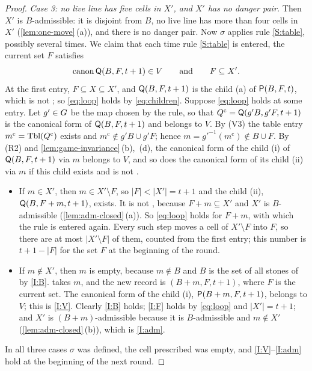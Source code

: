 \begin{proof}
\smallskip\noindent\emph{Case 3: no live line has five cells in $X'$, and $X'$ has no danger pair.} Then $X'$
is $B$-admissible: it is disjoint from $B$, no live line has more than four cells in $X'$
(\cref{lem:one-move}\,(a)), and there is no danger pair. Now $\sigma$ applies rule \ref{S:table}, possibly
several times. We claim that each time rule \ref{S:table} is entered, the current set $F$ satisfies
\begin{equation}\label{eq:loop}
  \operatorname{canon}\mathsf{Q}(B,F,t+1)\in V\qquad\text{and}\qquad F\subseteq X'.
\end{equation}
At the first entry, $F\subseteq X\subseteq X'$, and $\mathsf{Q}(B,F,t+1)$ is the child \textup{(a)} of
$\mathsf{P}(B,F,t)$, which is not \VOID; so \eqref{eq:loop} holds by \eqref{eq:children}. Suppose \eqref{eq:loop}
holds at some entry. Let $g'\in G$ be the map chosen by the rule, so that
$Q^{\mathrm c}=\mathsf{Q}(g'B,g'F,t+1)$ is the canonical form of $\mathsf{Q}(B,F,t+1)$ and belongs to $V$. By (V3) the
table entry $m^{\mathrm c}=\mathrm{Tbl}(Q^{\mathrm c})$ exists and $m^{\mathrm c}\notin g'B\cup g'F$; hence
$m=g'^{-1}(m^{\mathrm c})\notin B\cup F$. By (R2) and \cref{lem:game-invariance}\,(b),~(d), the canonical
form of the child \textup{(i)} of $\mathsf{Q}(B,F,t+1)$ via $m$ belongs to $V$, and so does the canonical form of
its child \textup{(ii)} via $m$ if this child exists and is not \VOID.
\begin{itemize}[leftmargin=2.2em]
\item If $m\in X'$, then $m\in X'\setminus F$, so $|F|<|X'|=t+1$ and the child \textup{(ii)},
  $\mathsf{Q}(B,F+m,t+1)$, exists. It is not \VOID, because $F+m\subseteq X'$ and $X'$ is $B$-admissible
  (\cref{lem:adm-closed}\,(a)). So \eqref{eq:loop} holds for $F+m$, with which the rule is entered again.
  Every such step moves a cell of $X'\setminus F$ into $F$, so there are at most $|X'\setminus F|$ of them,
  counted from the first entry; this number is $t+1-|F|$ for the set $F$ at the beginning of the round.
\item If $m\notin X'$, then $m$ is empty, because $m\notin B$ and $B$ is the set of all stones of \Breaker{}
  by \ref{I:B}. \Breaker{} takes $m$, and the new record is $(B+m,F,t+1)$, where $F$ is the current set. The
  canonical form of the child \textup{(i)}, $\mathsf{P}(B+m,F,t+1)$, belongs to $V$; this is \ref{I:V}. Clearly
  \ref{I:B} holds; \ref{I:F} holds by \eqref{eq:loop} and $|X'|=t+1$; and $X'$ is $(B+m)$-admissible because
  it is $B$-admissible and $m\notin X'$ (\cref{lem:adm-closed}\,(b)), which is \ref{I:adm}.
\end{itemize}
In all three cases $\sigma$ was defined, the cell prescribed was empty, and \ref{I:V}--\ref{I:adm} hold at the
beginning of the next round.
\end{proof}

